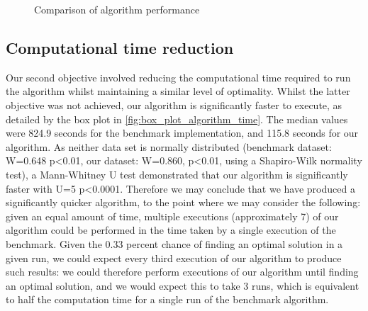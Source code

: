 \documentclass[british,10pt,a4paper]{article}
\begin{document}
\begin{figure}
  \vspace{-20pt}
  \begin{center}
	  \vspace{-20pt}
		\caption{Comparison of algorithm performance}
		\label{fig:box_plot_algorithm_perf}
	  \vspace{-10pt}
	  \end{center}
\end{figure}

\subsection{Computational time reduction}
\label{subsec:results_time}
Our second objective involved reducing the computational time required to run the algorithm whilst maintaining a similar level of optimality. Whilst the latter objective was not achieved, our algorithm is significantly faster to execute, as detailed by the box plot in \autoref{fig:box_plot_algorithm_time}. The median values were 824.9 seconds for the benchmark implementation, and 115.8 seconds for our algorithm. As neither data set is normally distributed (benchmark dataset: W=0.648 p<0.01, our dataset: W=0.860, p<0.01, using a Shapiro-Wilk normality test), a Mann-Whitney U test demonstrated that our algorithm is significantly faster with U=5 p<0.0001. Therefore we may conclude that we have produced a significantly quicker algorithm, to the point where we may consider the following: given an equal amount of time, multiple executions (approximately 7) of our algorithm could be performed in the time taken by a single execution of the benchmark. Given the 0.33 percent chance of finding an optimal solution in a given run, we could expect every third execution of our algorithm to produce such results: we could therefore perform executions of our algorithm until finding an optimal solution, and we would expect this to take 3 runs, which is equivalent to half the computation time for a single run of the benchmark algorithm. 
\end{document}
